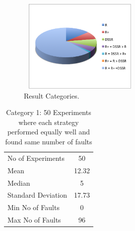 \documentclass[conference]{IEEEtran}
\begin{document}
\begin{figure}[ht]
\centering
\includegraphics[width=6cm,height=4.5cm]{pie1.png}
\caption{Result Categories.}
\label{fig:pie}
\end{figure}









%
%

\begin{table}[H]
\caption{Category 1: 50 Experiments where each strategy performed equally well and found same number of faults}
\centering
\begin{tabular}{|l|c|}
\hline\hline
No of Experiments 	& 50  	\\
Mean  			& 12.32  	\\
Median 			& 5 		\\
Standard Deviation 	& 17.73  	\\
Min No of Faults	&  0  		\\
Max No of Faults 	& 96  	\\
\hline
\end{tabular}
\label{table:equal}
\end{table}



\end{document}
